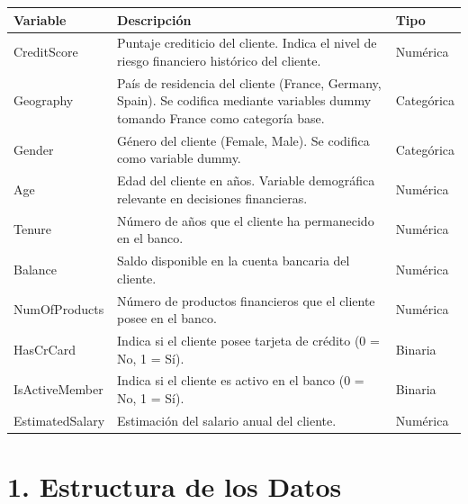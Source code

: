 \documentclass[
]{article}
\begin{document}
\begin{longtable}[]{@{}
  >{\raggedright\arraybackslash}p{}
  >{\raggedright\arraybackslash}p{}
  >{\raggedright\arraybackslash}p{}@{}}
\toprule\noalign{}
\begin{minipage}[b]{\linewidth}\raggedright
Variable
\end{minipage} & \begin{minipage}[b]{\linewidth}\raggedright
Descripción
\end{minipage} & \begin{minipage}[b]{\linewidth}\raggedright
Tipo
\end{minipage} \\
\midrule\noalign{}
\endhead
\bottomrule\noalign{}
\endlastfoot
CreditScore & Puntaje crediticio del cliente. Indica el nivel de riesgo
financiero histórico del cliente. & Numérica \\
Geography & País de residencia del cliente (France, Germany, Spain). Se
codifica mediante variables dummy tomando France como categoría base. &
Categórica \\
Gender & Género del cliente (Female, Male). Se codifica como variable
dummy. & Categórica \\
Age & Edad del cliente en años. Variable demográfica relevante en
decisiones financieras. & Numérica \\
Tenure & Número de años que el cliente ha permanecido en el banco. &
Numérica \\
Balance & Saldo disponible en la cuenta bancaria del cliente. &
Numérica \\
NumOfProducts & Número de productos financieros que el cliente posee en
el banco. & Numérica \\
HasCrCard & Indica si el cliente posee tarjeta de crédito (0 = No, 1 =
Sí). & Binaria \\
IsActiveMember & Indica si el cliente es activo en el banco (0 = No, 1 =
Sí). & Binaria \\
EstimatedSalary & Estimación del salario anual del cliente. &
Numérica \\
\end{longtable}

\section{1. Estructura de los Datos}\label{estructura-de-los-datos}
\end{document}
